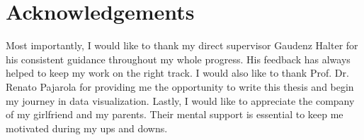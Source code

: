 \documentclass[11pt, a4paper,oneside,chapterprefix=false]{scrbook}
\begin{document}
\chapter*{Acknowledgements}
Most importantly, I would like to thank my direct supervisor Gaudenz Halter for his consistent guidance throughout my whole progress. His feedback has always helped to keep my work on the right track. I would also like to thank Prof. Dr. Renato
Pajarola for providing me the opportunity to write this thesis and begin my journey in data visualization. Lastly, I would like to appreciate the company of my girlfriend and my parents. Their mental support is essential to keep me motivated during my ups and downs.





\listoffigures
\listoftables
\end{document}
